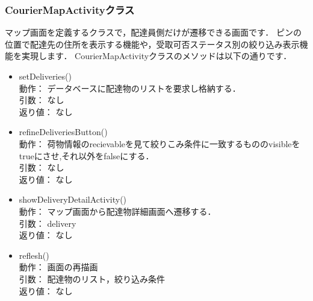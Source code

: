 \documentclass[a4j,titlepage]{jarticle}
\begin{document}
\subsubsection{CourierMapActivityクラス}
マップ画面を定義するクラスで，配達員側だけが遷移できる画面です．
ピンの位置で配達先の住所を表示する機能や，受取可否ステータス別の絞り込み表示機能を実現します．
CourierMapActivityクラスのメソッドは以下の通りです．
\begin{itemize}
\item setDeliveries()\\
  動作： データベースに配達物のリストを要求し格納する．\\
引数： なし\\
返り値： なし

\item refineDeliveriesButton()\\
動作： 荷物情報のrecievableを見て絞りこみ条件に一致するもののvisibleをtrueにさせ,それ以外をfalseにする．\\
引数： なし\\
返り値： なし

\item showDeliveryDetailActivity()\\
動作： マップ画面から配達物詳細画面へ遷移する．\\
引数： delivery\\
返り値： なし

\item reflesh()\\
動作： 画面の再描画\\
引数： 配達物のリスト，絞り込み条件\\
返り値： なし
\end{itemize}
\end{document}
